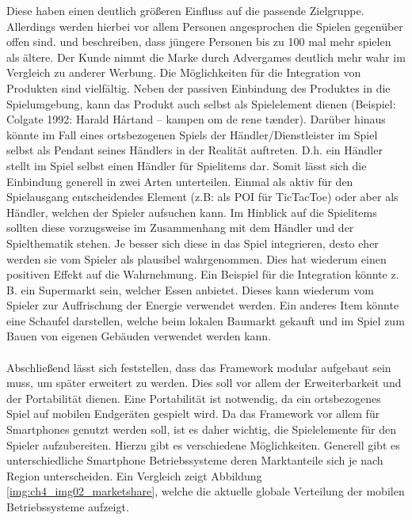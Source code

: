 Diese haben einen deutlich größeren Einfluss auf die passende Zielgruppe. Allerdings werden hierbei vor allem Personen angesprochen die Spielen gegenüber offen sind.\cite{Winkler.2006}
\textcite{Chen.2001} und \textcite{Dahl.2009} beschreiben, dass jüngere Personen bis zu 100 mal mehr spielen als ältere.
Der Kunde nimmt die Marke durch Advergames deutlich mehr wahr im Vergleich zu anderer Werbung.
Die Möglichkeiten für die Integration von Produkten sind vielfältig. Neben der passiven Einbindung des Produktes in die Spielumgebung, kann das Produkt auch selbst als Spielelement dienen (Beispiel: Colgate 1992: Harald Hårtand -- kampen om de rene tænder).
Darüber hinaus könnte im Fall eines ortsbezogenen Spiels der Händler/Dienstleister im Spiel selbst als Pendant seines Händlers in der Realität auftreten. D.h. ein Händler stellt im Spiel selbst einen Händler für Spielitems dar.
Somit lässt sich die Einbindung generell in zwei Arten unterteilen. Einmal als aktiv für den Spielausgang entscheidendes Element (z.B: als POI für TicTacToe) oder aber als Händler, welchen der Spieler aufsuchen kann.
Im Hinblick auf die Spielitems sollten diese vorzugsweise im Zusammenhang mit dem Händler und der Spielthematik stehen. Je besser sich diese in das Spiel integrieren, desto eher werden sie vom Spieler als plausibel wahrgenommen. Dies hat wiederum einen positiven Effekt auf die Wahrnehmung.
Ein Beispiel für die Integration könnte z.\,B. ein Supermarkt sein, welcher Essen anbietet. Dieses kann wiederum vom Spieler zur Auffrischung der Energie verwendet werden. Ein anderes Item könnte eine Schaufel darstellen, welche beim lokalen Baumarkt gekauft und im Spiel zum Bauen von eigenen Gebäuden verwendet werden kann.
\\\\
Abschließend lässt sich feststellen, dass das Framework modular aufgebaut sein muss, um später erweitert zu werden. Dies soll vor allem der Erweiterbarkeit und der Portabilität dienen. Eine Portabilität ist notwendig, da ein ortsbezogenes Spiel auf mobilen Endgeräten gespielt wird. Da das Framework vor allem für Smartphones genutzt werden soll, ist es daher wichtig, die Spielelemente für den Spieler aufzubereiten. Hierzu gibt es verschiedene Möglichkeiten.
Generell gibt es unterschiedliche Smartphone Betriebssysteme deren Marktanteile sich je nach Region unterscheiden.
Ein Vergleich zeigt Abbildung \ref{img:ch4_img02_marketshare}, welche die aktuelle globale Verteilung der mobilen Betriebssysteme aufzeigt.

